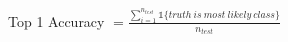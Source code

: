 \usepackage{amsmath}
\usepackage{mathtools}
\usepackage{dsfont}

Top 1 Accuracy $ = \frac{\sum_{i=1}^{n_{test}} \mathds{1} \{truth\ is\ most\ likely\ class\}}{n_{test}}$